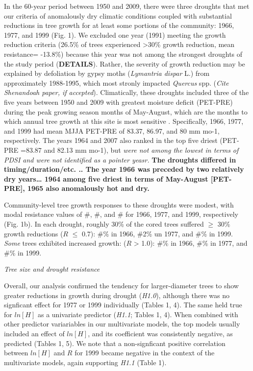 \documentclass[]{article}
\begin{document}
In the 60-year period between 1950 and 2009, there were three droughts
that met our criteria of anomalously dry climatic conditions coupled
with substantial reductions in tree growth for at least some portions of
the community: 1966, 1977, and 1999 (Fig. 1). We excluded one year
(1991) meeting the growth reduction criteria (26.5\% of trees
experienced \textgreater{}30\% growth reduction, mean resistance=
-13.8\%) because this year was not among the strongest droughts of the
study period (\textbf{DETAILS}). Rather, the severity of growth
reduction may be explained by defoliation by gypsy moths
(\emph{Lymantria dispar} L.) from approximately 1988-1995, which most
stronly impacted \emph{Quercus} spp. (\emph{Cite Shenandoah paper, if
accepted}). Climatically, these droughts included three of the five
years between 1950 and 2009 with greatest moisture deficit (PET-PRE)
during the peak growing season months of May-August, which are the
months to which annual tree growth at this site is most sensitive
\citep{helcoski_growing_2019}. Specifically, 1966, 1977, and 1999 had
mean MJJA PET-PRE of 83.37, 86.97, and 80 mm mo-1, respectively. The
years 1964 and 2007 also ranked in the top five driest (PET-PRE =83.87
and 82.13 mm mo-1), but \emph{were not among the lowest in terms of PDSI
and were not identified as a pointer yeasr.} \textbf{The droughts
differed in timing/duration/etc. .. The year 1966 was preceded by two
relatively dry years\ldots{} 1964 among five driest in terms of
May-August {[}PET-PRE{]}, 1965 also anomalously hot and dry. }

Community-level tree growth responses to these droughts were modest,
with modal resistance values of \#, \#, and \# for 1966, 1977, and 1999,
respectively (Fig. 1b). In each drought, roughly 30\% of the cored trees
suffered \(\ge\) 30\% growth reductions (\(R\) \(\le\) 0.7): \#\% in
1966, \#2\% un 1977, and \#\% in 1999. \emph{Some} trees exhibited
increased growth: (\(R\) \textgreater{} 1.0): \#\% in 1966, \#\% in
1977, and \#\% in 1999.

\emph{Tree size and drought resistance}

Overall, our analysis confirmed the tendency for larger-diameter trees
to show greater reductions in growth during drought
\citep{bennett_larger_2015} (\emph{H1.0}), although there was no
signficant effect for 1977 or 1999 individually (Tables 1, 4). The same
held true for \(ln[H]\) as a univariate predictor (\emph{H1.1}; Tables
1, 4). When combined with other predictor variariables in our
multivariate models, the top models usually included an effect of
\(ln[H]\), and its coefficient was consistently negative, as predicted
(Tables 1, 5). We note that a non-signficant positive correlation
between \(ln[H]\) and \(R\) for 1999 became negative in the context of
the multivariate models, again supporting \emph{H1.1} (Table 1).
\end{document}

